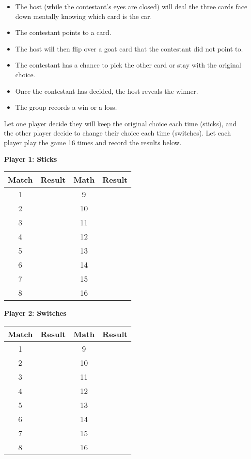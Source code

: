 \begin{itemize}
    \item The host (while the contestant’s eyes are closed) will deal the three cards face down mentally knowing which card is the car.
    \item The contestant points to a card. 
    \item The host will then flip over a goat card that the contestant did not point to.
    \item The contestant has a chance to pick the other card or stay with the original choice.
    \item Once the contestant has decided, the host reveals the winner.
    \item The group records a win or a loss.
\end{itemize}
	
\noindent Let one player decide they will keep the original choice each time (sticks), and the other player decide to change their choice each time (switches). Let each player play the game 16 times and record the results below.

\noindent \textbf{Player 1: Sticks}

\begin{center}
\begin{tabular}{ |c|c|c| c|} 
 \hline
Match & Result & Math & Result \\
 \hline
1 &  & 9 &  \\
\hline
2 &  & 10 &  \\
\hline
3 &  & 11 &  \\
\hline
4 &  & 12 &  \\
\hline
5 &  & 13 &  \\
\hline
6 &  & 14 &  \\
\hline
7 &  & 15 &  \\
\hline
8 &  & 16 &  \\
\hline
\end{tabular}
\end{center}

\noindent \textbf{Player 2: Switches}

\begin{center}
\begin{tabular}{ |c|c|c| c|} 
 \hline
Match & Result & Math & Result \\
 \hline
1 &  & 9 &  \\
\hline
2 &  & 10 &  \\
\hline
3 &  & 11 &  \\
\hline
4 &  & 12 &  \\
\hline
5 &  & 13 &  \\
\hline
6 &  & 14 &  \\
\hline
7 &  & 15 &  \\
\hline
8 &  & 16 &  \\
\hline
\end{tabular}
\end{center}


